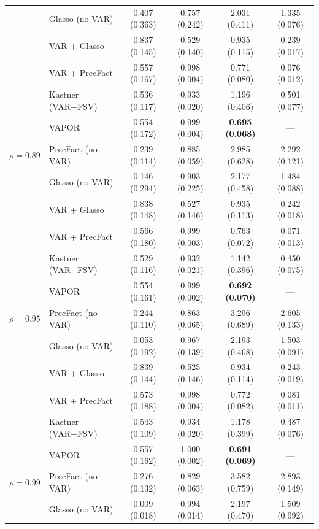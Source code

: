 \begin{table}[h!]
\begin{tabular}{llcccc}
              & Glasso (no VAR)    & 0.407 (0.363) & 0.757 (0.242) & 2.031 (0.411) & 1.335 (0.076) \\
              & VAR + Glasso       & 0.837 (0.145) & 0.529 (0.140) & 0.935 (0.115) & 0.239 (0.017) \\
              & VAR + PrecFact     & 0.557 (0.167) & 0.998 (0.004) & 0.771 (0.080) & 0.076 (0.012) \\
              & Kastner (VAR+FSV)  & 0.536 (0.117) & 0.933 (0.020) & 1.196 (0.406) & 0.501 (0.077) \\
              & VAPOR              & 0.554 (0.172) & 0.999 (0.004) & \textbf{0.695 (0.068)} & --- \\
\midrule
$\rho = 0.89$ & PrecFact (no VAR)  & 0.239 (0.114) & 0.885 (0.059) & 2.985 (0.628) & 2.292 (0.121) \\
              & Glasso (no VAR)    & 0.146 (0.294) & 0.903 (0.225) & 2.177 (0.458) & 1.484 (0.088) \\
              & VAR + Glasso       & 0.838 (0.148) & 0.527 (0.146) & 0.935 (0.113) & 0.242 (0.018) \\
              & VAR + PrecFact     & 0.566 (0.180) & 0.999 (0.003) & 0.763 (0.072) & 0.071 (0.013) \\
              & Kastner (VAR+FSV)  & 0.529 (0.116) & 0.932 (0.021) & 1.142 (0.396) & 0.450 (0.075) \\
              & VAPOR              & 0.554 (0.161) & 0.999 (0.002) & \textbf{0.692 (0.070)} & --- \\
\midrule
$\rho = 0.95$ & PrecFact (no VAR)  & 0.244 (0.110) & 0.863 (0.065) & 3.296 (0.689) & 2.605 (0.133) \\
              & Glasso (no VAR)    & 0.053 (0.192) & 0.967 (0.139) & 2.193 (0.468) & 1.503 (0.091) \\
              & VAR + Glasso       & 0.839 (0.144) & 0.525 (0.146) & 0.934 (0.114) & 0.243 (0.019) \\
              & VAR + PrecFact     & 0.573 (0.188) & 0.998 (0.004) & 0.772 (0.082) & 0.081 (0.011) \\
              & Kastner (VAR+FSV)  & 0.543 (0.109) & 0.934 (0.020) & 1.178 (0.399) & 0.487 (0.076) \\
              & VAPOR              & 0.557 (0.162) & 1.000 (0.002) & \textbf{0.691 (0.069)} & --- \\
\midrule
$\rho = 0.99$ & PrecFact (no VAR)  & 0.276 (0.132) & 0.829 (0.063) & 3.582 (0.759) & 2.893 (0.149) \\
              & Glasso (no VAR)    & 0.009 (0.018) & 0.994 (0.014) & 2.197 (0.470) & 1.509 (0.092) \\

\end{tabular}
\end{table}
